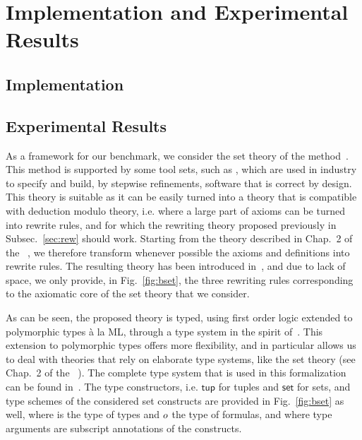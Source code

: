 
\section{Implementation and Experimental Results}
\label{sec:bench}

\subsection{Implementation}


\subsection{Experimental Results}

As a framework for our benchmark, we consider the set theory of the \bmth{}
method~\cite{B-Book}. This method is supported by some tool sets, such as
\atelierb{}, which are used in industry to specify and build, by stepwise
refinements, software that is correct by design. This theory is suitable as it
can be easily turned into a theory that is compatible with deduction modulo
theory, i.e. where a large part of axioms can be turned into rewrite rules, and
for which the rewriting theory proposed previously in Subsec.~\ref{sec:rew}
should work. Starting from the theory described in Chap.~2 of the
\bbook{}~\cite{B-Book}, we therefore transform whenever possible the axioms and
definitions into rewrite rules. The resulting theory has been introduced
in~\cite{BA15}, and due to lack of space, we only provide, in
Fig.~\ref{fig:bset}, the three rewriting rules corresponding to the axiomatic
core of the \bmth{} set theory that we consider.

As can be seen, the proposed theory is typed, using first order logic extended
to polymorphic types à la ML, through a type system in the spirit
of~\cite{BP13}. This extension to polymorphic types offers more flexibility, and
in particular allows us to deal with theories that rely on elaborate type
systems, like the \bmth{} set theory (see Chap.~2 of the
\bbook{}~\cite{B-Book}). The complete type system that is used in this
formalization can be found in~\cite{BA15}. The type constructors,
i.e. $\mathsf{tup}$ for tuples and $\mathsf{set}$ for sets, and type schemes of
the considered set constructs are provided in Fig.~\ref{fig:bset} as well, where
\type{} is the type of types and $o$ the type of formulas, and where type
arguments are subscript annotations of the constructs.

